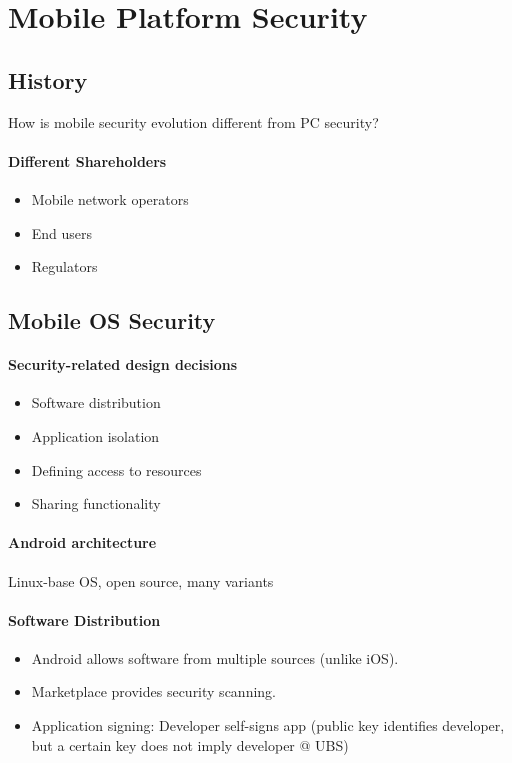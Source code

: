 \section{Mobile Platform Security}

\subsection{History}
How is mobile security evolution different from PC security?

\paragraph{Different Shareholders}
\begin{itemize}
    \item Mobile network operators
    \item End users
    \item Regulators
\end{itemize}{}

\subsection{Mobile OS Security}
\paragraph{Security-related design decisions}
\begin{itemize}
    \item Software distribution
    \item Application isolation
    \item Defining access to resources
    \item Sharing functionality
\end{itemize}{}

\paragraph{Android architecture}
Linux-base OS, open source, many variants\\

\paragraph{Software Distribution}
\begin{itemize}
    \item Android allows software from multiple sources (unlike iOS).
    \item Marketplace provides security scanning.
    \item Application signing: Developer self-signs app (public key identifies developer, but a certain key does not imply developer @ UBS) 
\end{itemize}{}

